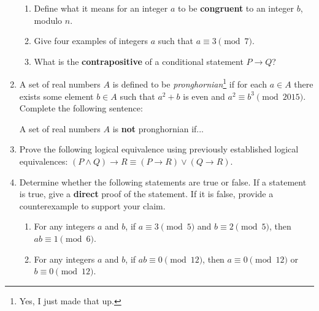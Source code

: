 \documentclass[12pt]{article}
\newcommand{\points}[1]{\marginpar{\hspace{24pt}[#1]}}
\begin{document}
\begin{enumerate}
\begin{enumerate}
\item Define what it means for an integer $a$ to be {\bf congruent} to an integer $b$, modulo $n$.\points{2}

\vspace{1.5in}

\item Give four examples of integers $a$ such that $a\equiv 3 \pmod{7}$. \points{2}

\vspace{1.5in}

\item What is the {\bf contrapositive} of a conditional statement $P\to Q$? \points{2}


\end{enumerate}
\newpage

\item A set of real numbers $A$ is defined to be {\em pronghornian}\footnote{Yes, I just made that up.} if for each $a\in A$ there exists some element $b\in A$ such that $a^2+b$ is even and $a^2\equiv b^3 \pmod{2015}$. Complete the following sentence:\points{3}

\medskip

A set of real numbers $A$ is {\bf not} pronghornian if...

\vspace{2.5in}

\item Prove the following logical equivalence using previously established logical equivalences: $(P\wedge Q)\to R\equiv (P\to R)\vee (Q\to R)$. \points{5}



\newpage

\item Determine whether the following statements are true or false. If a statement is true, give a {\bf direct} proof of the statement. If it is false, provide a counterexample to support your claim.
\begin{enumerate}
\item For any integers $a$ and $b$, if $a\equiv 3\pmod{5}$ and $b\equiv 2\pmod{5}$, then $ab\equiv 1\pmod{6}$. \points{4}

\vspace{2.5in}

\item For any integers $a$ and $b$, if $ab\equiv 0\pmod{12}$, then $a\equiv 0\pmod{12}$ or $b\equiv 0 \pmod{12}$. \points{4}

\vspace{2in}


\end{enumerate}
\end{enumerate}
\end{document}
